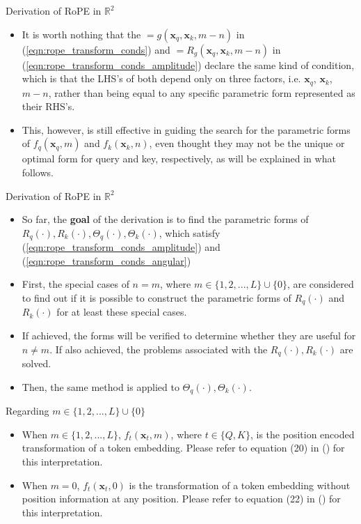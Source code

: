 \documentclass{beamer}
\begin{document}
	\begin{frame}{Derivation of RoPE in $\mathbb{R}^2$}
		\begin{itemize}
			\item It is worth nothing that the $= g(\mathbf{x}_q, \mathbf{x}_k, m-n)$ in (\ref{eqn:rope_transform_conds}) and $= R_g(\mathbf{x}_q, \mathbf{x}_k, m-n)$ in (\ref{eqn:rope_transform_conds_amplitude}) declare the same kind of condition, which is that the LHS's of both depend only on three factors, i.e. $\mathbf{x}_q$, $\mathbf{x}_k$, $m-n$, rather than being equal to any specific parametric form represented as their RHS's.
			\item This, however, is still effective in guiding the search for the parametric forms of $f_q(\mathbf{x}_q, m)$ and $f_k(\mathbf{x}_k, n)$, even thought they may not be the unique or optimal form for query and key, respectively, as will be explained in what follows.
		\end{itemize}
	\end{frame}
	
	\begin{frame}{Derivation of RoPE in $\mathbb{R}^2$}
		\begin{itemize}		
			\item So far, the \textbf{goal} of the derivation is to find the parametric forms of $R_q(\cdot), R_k(\cdot), \Theta_q(\cdot), \Theta_k(\cdot)$, which satisfy (\ref{eqn:rope_transform_conds_amplitude}) and (\ref{eqn:rope_transform_conds_angular})
			\item First, the special cases of $n=m$, where $m \in \{1,2,...,L\} \cup \{0\}$, are considered to find out if it is possible to construct the parametric forms of $R_q(\cdot)$ and $R_k(\cdot)$ for at least these special cases. 
			\item If achieved, the forms will be verified to determine whether they are useful for $n\neq m$. If also achieved, the problems associated with the $R_q(\cdot), R_k(\cdot)$ are solved.
			\item Then, the same method is applied to $\Theta_q(\cdot), \Theta_k(\cdot)$.
		\end{itemize}
		\begin{block}{Regarding $m\in\{1,2,...,L\} \cup \{0\}$}
			\begin{itemize}
				\item When $m\in\{1,2,...,L\}$, $f_t(\mathbf{x}_t, m)$, where $t\in\{Q, K\}$, is the position encoded transformation of a token embedding. Please refer to equation (20) in (\cite{su2023roformerenhancedtransformerrotary}) for this interpretation.
				\item When $m=0$, $f_t(\mathbf{x}_t, 0)$ is the transformation of a token embedding without position information at any position. Please refer to equation (22) in (\cite{su2023roformerenhancedtransformerrotary}) for this interpretation.
			\end{itemize}
		\end{block}
	\end{frame}
	
\end{document}
